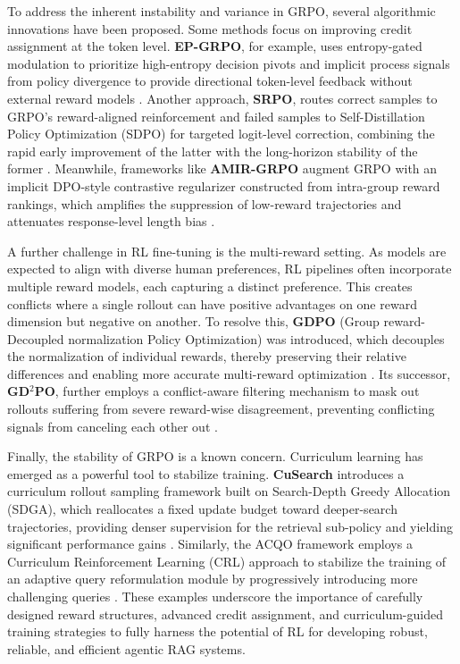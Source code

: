 \documentclass[11pt]{article}
\begin{document}
To address the inherent instability and variance in GRPO, several algorithmic innovations have been proposed. Some methods focus on improving credit assignment at the token level. \textbf{EP-GRPO}, for example, uses entropy-gated modulation to prioritize high-entropy decision pivots and implicit process signals from policy divergence to provide directional token-level feedback without external reward models \cite{ref269}. Another approach, \textbf{SRPO}, routes correct samples to GRPO's reward-aligned reinforcement and failed samples to Self-Distillation Policy Optimization (SDPO) for targeted logit-level correction, combining the rapid early improvement of the latter with the long-horizon stability of the former \cite{ref270}. Meanwhile, frameworks like \textbf{AMIR-GRPO} augment GRPO with an implicit DPO-style contrastive regularizer constructed from intra-group reward rankings, which amplifies the suppression of low-reward trajectories and attenuates response-level length bias \cite{ref271}.

A further challenge in RL fine-tuning is the multi-reward setting. As models are expected to align with diverse human preferences, RL pipelines often incorporate multiple reward models, each capturing a distinct preference. This creates conflicts where a single rollout can have positive advantages on one reward dimension but negative on another. To resolve this, \textbf{GDPO} (Group reward-Decoupled normalization Policy Optimization) was introduced, which decouples the normalization of individual rewards, thereby preserving their relative differences and enabling more accurate multi-reward optimization \cite{ref272,ref273}. Its successor, \textbf{GD\(^2\)PO}, further employs a conflict-aware filtering mechanism to mask out rollouts suffering from severe reward-wise disagreement, preventing conflicting signals from canceling each other out \cite{ref273}.

Finally, the stability of GRPO is a known concern. Curriculum learning has emerged as a powerful tool to stabilize training. \textbf{CuSearch} introduces a curriculum rollout sampling framework built on Search-Depth Greedy Allocation (SDGA), which reallocates a fixed update budget toward deeper-search trajectories, providing denser supervision for the retrieval sub-policy and yielding significant performance gains \cite{ref274}. Similarly, the ACQO framework employs a Curriculum Reinforcement Learning (CRL) approach to stabilize the training of an adaptive query reformulation module by progressively introducing more challenging queries \cite{ref131}. These examples underscore the importance of carefully designed reward structures, advanced credit assignment, and curriculum-guided training strategies to fully harness the potential of RL for developing robust, reliable, and efficient agentic RAG systems.
\end{document}
